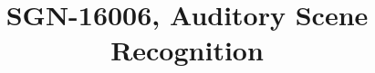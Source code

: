 \documentclass{article}
\title{SGN-16006,
  Auditory Scene Recognition
}
\begin{document}
\maketitle
\sloppy







\small

\printbibliography{}

\vfill\pagebreak
\end{document}
